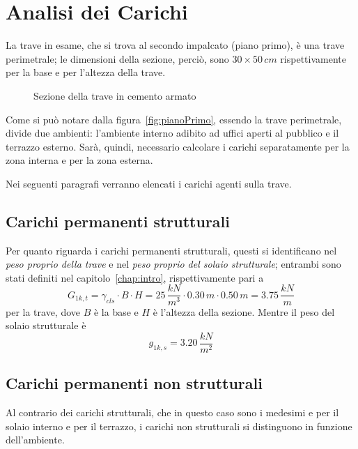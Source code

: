 \section{Analisi dei Carichi}\label{sec:loads}
 La trave in esame, che si trova al secondo impalcato (piano primo), è una trave perimetrale; le dimensioni della sezione, perciò, sono $30\times 50\,\si{cm}$ rispettivamente per la base e per l'altezza della trave.

\begin{figure}
 \centering
 \caption{Sezione della trave in cemento armato}
 \label{fig:beamSec}
\end{figure}

Come si può notare dalla figura~\ref{fig:pianoPrimo}, essendo la trave perimetrale, divide due ambienti: l'ambiente interno adibito ad uffici aperti al pubblico e il terrazzo esterno. Sarà, quindi,  necessario calcolare i carichi separatamente per la zona interna e per la zona esterna.

Nei seguenti paragrafi verranno elencati i carichi agenti sulla trave.

\subsection{Carichi permanenti strutturali}
Per quanto riguarda i carichi permanenti strutturali, questi si identificano nel \emph{peso proprio della trave} e nel \emph{peso proprio del solaio strutturale}; entrambi sono stati definiti nel capitolo~\ref{chap:intro}, rispettivamente pari a
\begin{equation*}
 G_{1k, t} = \gamma_{cls}\cdot B\cdot H = 25\,\dfrac{kN}{m^3} \cdot 0.30\,\si{m}\cdot 0.50\,\si{m} = 3.75\,\dfrac{kN}{m}
\end{equation*}
per la trave, dove $B$ è la base e $H$ è l'altezza della sezione. Mentre il peso del solaio strutturale è
\begin{equation*}
 g_{1k, s} = 3.20\,\dfrac{kN}{m^2}
\end{equation*}

\subsection{Carichi permanenti non strutturali}
Al contrario dei carichi strutturali, che in questo caso sono i medesimi e per il solaio interno e per il terrazzo, i carichi non strutturali si distinguono in funzione dell'ambiente.

